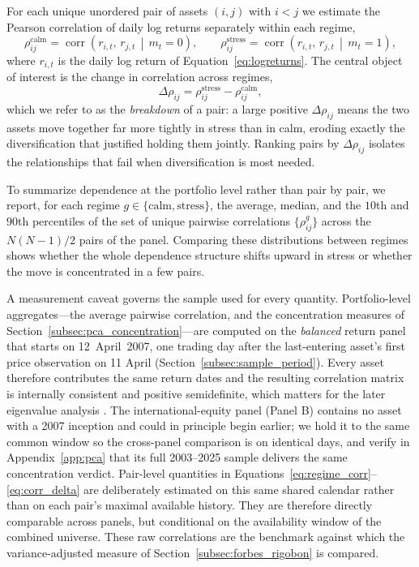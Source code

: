 For each unique unordered pair of assets $(i,j)$ with $i<j$ we estimate the Pearson correlation of daily log returns separately within each regime,
\begin{equation}
\rho^{\mathrm{calm}}_{ij} = \operatorname{corr}\!\left(r_{i,t},\, r_{j,t} \,\middle|\, m_t = 0\right),
\qquad
\rho^{\mathrm{stress}}_{ij} = \operatorname{corr}\!\left(r_{i,t},\, r_{j,t} \,\middle|\, m_t = 1\right),
\label{eq:regime_corr}
\end{equation}
where $r_{i,t}$ is the daily log return of Equation~\eqref{eq:logreturns}. The central object of interest is the change in correlation across regimes,
\begin{equation}
\Delta\rho_{ij} = \rho^{\mathrm{stress}}_{ij} - \rho^{\mathrm{calm}}_{ij},
\label{eq:corr_delta}
\end{equation}
which we refer to as the \emph{breakdown} of a pair: a large positive $\Delta\rho_{ij}$ means the two assets move together far more tightly in stress than in calm, eroding exactly the diversification that justified holding them jointly. Ranking pairs by $\Delta\rho_{ij}$ isolates the relationships that fail when diversification is most needed.

To summarize dependence at the portfolio level rather than pair by pair, we report, for each regime $g \in \{\mathrm{calm}, \mathrm{stress}\}$, the average, median, and the $10$th and $90$th percentiles of the set of unique pairwise correlations $\{\rho^{g}_{ij}\}$ across the $N(N-1)/2$ pairs of the panel. Comparing these distributions between regimes shows whether the whole dependence structure shifts upward in stress or whether the move is concentrated in a few pairs.

A measurement caveat governs the sample used for every quantity. Portfolio-level aggregates---the average pairwise correlation, and the concentration measures of Section~\ref{subsec:pca_concentration}---are computed on the \emph{balanced} return panel that starts on \mbox{12 April 2007}, one trading day after the last-entering asset's first price observation on 11 April (Section~\ref{subsec:sample_period}). Every asset therefore contributes the same return dates and the resulting correlation matrix is internally consistent and positive semidefinite, which matters for the later eigenvalue analysis \citep{lewis1995pairwise,jolliffe2002pca}. The international-equity panel (Panel B) contains no asset with a 2007 inception and could in principle begin earlier; we hold it to the same common window so the cross-panel comparison is on identical days, and verify in Appendix~\ref{app:pca} that its full 2003--2025 sample delivers the same concentration verdict. Pair-level quantities in Equations~\eqref{eq:regime_corr}--\eqref{eq:corr_delta} are deliberately estimated on this same shared calendar rather than on each pair's maximal available history. They are therefore directly comparable across panels, but conditional on the availability window of the combined universe. These raw correlations are the benchmark against which the variance-adjusted measure of Section~\ref{subsec:forbes_rigobon} is compared.

